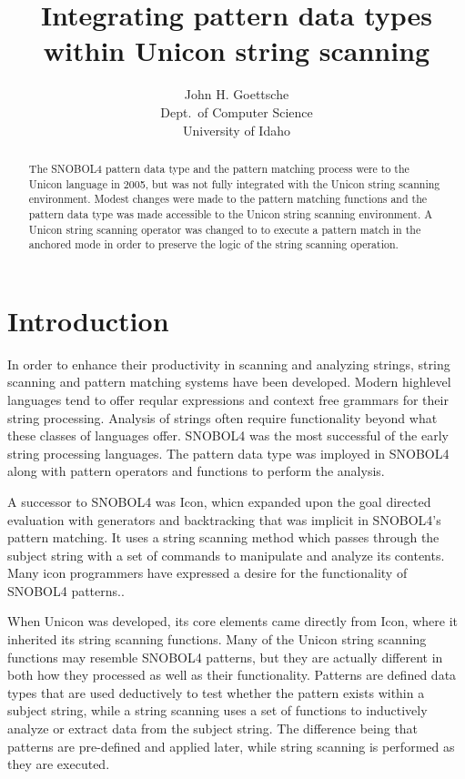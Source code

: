 \documentclass{article}
\begin{document}
\title{Integrating pattern data types within Unicon string scanning}
\author{John H. Goettsche\\
  Dept.\ of Computer Science\\
  University of Idaho}

\maketitle

\begin{abstract}
The SNOBOL4 pattern data type and the pattern matching process were to the Unicon language in 2005, but was not fully integrated with the Unicon string scanning environment.  Modest changes were made to the pattern matching functions and the pattern data type was made accessible to the Unicon string scanning environment.  A Unicon string scanning operator was changed to to execute a pattern match in the anchored mode in order to preserve the logic of the string scanning operation. 

\end{abstract}

\pagebreak
\tableofcontents

\pagebreak
\section{Introduction}
In order to enhance their productivity in scanning and analyzing strings, string scanning and pattern matching systems have been developed.  Modern highlevel languages tend to offer reqular expressions and context free grammars for their string processing.  Analysis of strings often require functionality beyond what these classes of languages offer.  SNOBOL4 was the most successful of the early string processing languages.\cite{Gaikaiwari2005}  The pattern data type was imployed in SNOBOL4 along with pattern operators and functions to perform the analysis.

A successor to SNOBOL4 was Icon, whicn expanded upon the goal directed evaluation with generators and backtracking that was implicit in SNOBOL4's pattern matching.\cite{Gaikaiwari2005}  It uses a string scanning method which passes through the subject string with a set of commands to manipulate and analyze its contents.  Many icon programmers have expressed a desire for the functionality of SNOBOL4 patterns.\cite{Griswold1980}.

When Unicon was developed, its core elements came directly from Icon, where it inherited its string scanning functions.\cite{JefferyUnicon}  Many of the Unicon string scanning functions may resemble SNOBOL4 patterns, but they are actually different in both how they processed as well as their functionality.  Patterns are defined data types that are used deductively to test whether the pattern exists within a subject string, while a string scanning uses a set of functions to inductively analyze or extract data from the subject string.  The difference being that patterns are pre-defined and applied later, while string scanning is performed as they are executed.
\end{document}

